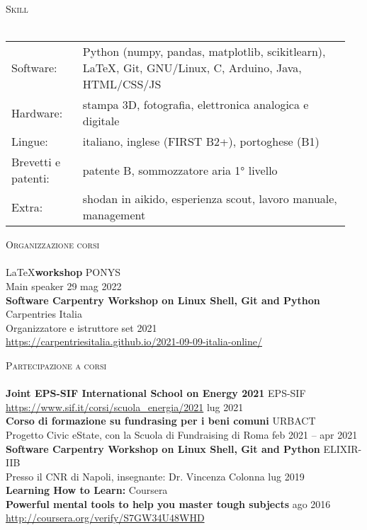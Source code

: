 \documentclass[a4paper]{article}
\newcommand{\lineunder} {
  \vspace*{-8pt} \\
  \hspace*{-18pt} \hrulefill \\
}
\newcommand{\header} [1] {
  {\hspace*{-18pt}\vspace*{6pt} \textsc{#1}}
  \vspace*{-6pt} \lineunder
}
\begin{document}
\header{Skill}
\begin{tabular}{ p{0.2\linewidth} p{0.75\linewidth} }
  Software: & Python (numpy, pandas, matplotlib, scikitlearn), LaTeX, Git, GNU/Linux,
              C, Arduino, Java, HTML/CSS/JS \\
  Hardware: & stampa 3D, fotografia, elettronica analogica e digitale \\
  Lingue: & italiano, inglese (FIRST B2+),
            portoghese (B1) \\
  Brevetti e patenti: & patente B, sommozzatore aria 1° livello \\
  Extra: & shodan in aikido, esperienza scout, lavoro manuale, management
\end{tabular}
\vspace{2mm}

\header{Organizzazione corsi}
\LaTeX \textbf{workshop} \hfill PONYS \\
Main speaker \hfill 29 mag 2022 \\
\vspace*{2mm}
\textbf{Software Carpentry Workshop on Linux Shell, Git and Python} \hfill Carpentries Italia\\
Organizzatore e istruttore \hfill set 2021 \\
\url{https://carpentriesitalia.github.io/2021-09-09-italia-online/} \\
\vspace*{2mm}

\header{Partecipazione a corsi}
\textbf{Joint EPS-SIF International School on Energy 2021} \hfill EPS-SIF \\
\url{https://www.sif.it/corsi/scuola_energia/2021} \hfill lug 2021 \\
\vspace*{2mm}
\textbf{Corso di formazione su fundrasing per i beni comuni} \hfill URBACT \\
Progetto Civic eState, con la Scuola di Fundraising di Roma \hfill feb 2021 -- apr 2021\\
\vspace*{2mm}
\textbf{Software Carpentry Workshop on Linux Shell, Git and Python} \hfill ELIXIR-IIB\\
Presso il CNR di Napoli, insegnante: Dr. Vincenza Colonna \hfill lug 2019\\
\vspace*{2mm}
\textbf{Learning How to Learn:} \hfill Coursera\\
\textbf{Powerful mental tools to help you master tough subjects} \hfill ago 2016\\
\url{http://coursera.org/verify/S7GW34U48WHD}\\
\vspace*{2mm}
\end{document}
